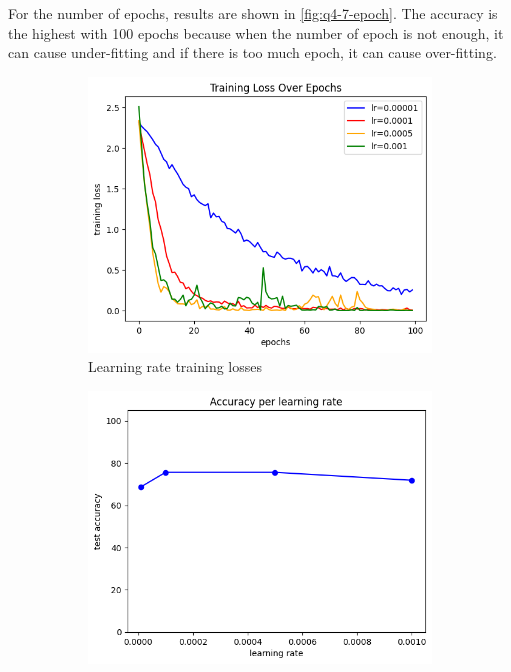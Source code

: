 For the number of epochs, results are shown in \cref{fig:q4-7-epoch}. The accuracy is the highest with 100 epochs because when the number of epoch is not enough, it can cause under-fitting and if there is too much epoch, it can cause over-fitting.

\begin{figure}
	\centering
	\begin{subfigure}{0.23\linewidth}
		\centering
		\includegraphics[width=\linewidth]{image/q4-7-lr-train.png}
		\caption{Learning rate training losses}
		\label{fig:q4-7-lr-train}
	\end{subfigure}%
	\hfill
	\begin{subfigure}{0.23\linewidth}
		\centering
		\includegraphics[width=\linewidth]{image/q4-7-lr.png}

\end{subfigure}
\end{figure}
